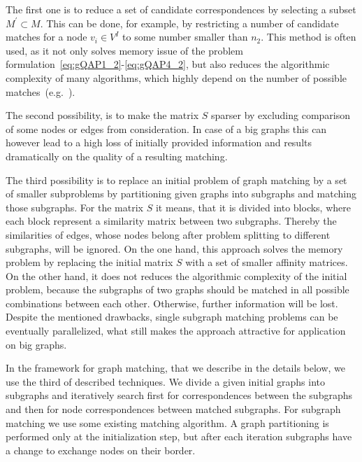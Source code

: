 The first one is to reduce a set of candidate correspondences by selecting a subset $M^\prime\subset M$. This can be done, for example, by restricting a number of candidate matches for a node $v_i\in V^I$ to some number smaller than $n_2$. This method is often used, as it not only solves memory issue of the problem formulation~\eqref{eq:gQAP1_2}-\eqref{eq:gQAP4_2}, but also reduces the algorithmic complexity of many algorithms, which highly depend on the number of possible matches~(e.g.~\cite{Cho2014_Haystack,Cho2010_RRWM,Cho2012_ProgressiveGM, Leordeanu2005_SM}).

The second possibility, is to make the matrix $S$ sparser by excluding comparison of some nodes or edges from consideration. In case of a big graphs this can however lead to a high loss of initially provided information and results dramatically on the quality of a resulting matching. 

The third possibility is to replace an initial problem of graph matching by a set of smaller subproblems by partitioning given graphs into subgraphs and matching those subgraphs. For the matrix $S$ it means, that it is divided into blocks, where each block represent a similarity matrix between two subgraphs. Thereby the similarities of edges, whose nodes belong after problem splitting to different subgraphs, will be ignored. On the one hand, this approach solves the memory problem by replacing the initial matrix $S$ with a set of smaller affinity matrices. On the other hand, it does not reduces the algorithmic complexity of the initial problem, because the subgraphs of two graphs should be matched in all possible combinations between each other. Otherwise, further information will be lost. Despite the mentioned drawbacks, single subgraph matching problems can be eventually parallelized, what still makes the approach attractive for application on big graphs.

In the framework for graph matching, that we describe in the details below, we use the third of described techniques. We divide a given initial graphs into subgraphs and iteratively search first for correspondences between the subgraphs and then for node correspondences between matched subgraphs. For subgraph matching we use some existing matching algorithm. A graph partitioning is performed only at the initialization step, but after each iteration subgraphs have a change to exchange nodes on their border.

